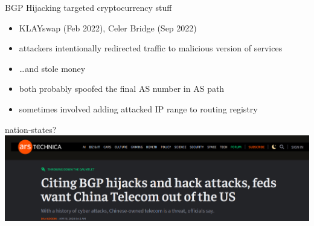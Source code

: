 \begin{frame}{BGP Hijacking targeted cryptocurrency stuff}
    \begin{itemize}
    \item KLAYswap (Feb 2022), Celer Bridge (Sep 2022)
    \item attackers intentionally redirected traffic to malicious version of services
    \item \ldots and stole money
    \vspace{.5cm}
    \item both probably spoofed the final AS number in AS path
    \item sometimes involved adding attacked IP range to routing registry
    \end{itemize}
\end{frame}

\begin{frame}{nation-states?}
\includegraphics[width=\textwidth]{china-tele-ars-tech}
\end{frame}
